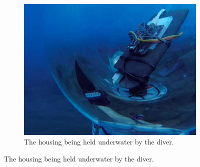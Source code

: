 \begin{figure}[!h]
  \centering
  \begin{subfigure}{0.7\textwidth}
    \centering
    \includegraphics[width=1\textwidth]{figures/underwater_5.jpg}
    \caption{ The housing being held underwater by the diver.  }
    \label{fig:underwater}
  \end{subfigure}


\end{figure}
